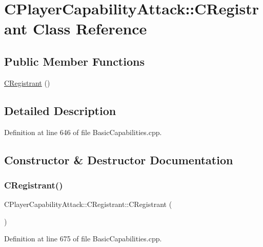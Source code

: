 \hypertarget{classCPlayerCapabilityAttack_1_1CRegistrant}{}\section{C\+Player\+Capability\+Attack\+:\+:C\+Registrant Class Reference}
\label{classCPlayerCapabilityAttack_1_1CRegistrant}
\subsection*{Public Member Functions}
\begin{DoxyCompactItemize}
\item 
\hyperlink{classCPlayerCapabilityAttack_1_1CRegistrant_afe5887c5ba5ae7d0b65e4820d6f9143e}{C\+Registrant} ()
\end{DoxyCompactItemize}


\subsection{Detailed Description}


Definition at line 646 of file Basic\+Capabilities.\+cpp.



\subsection{Constructor \& Destructor Documentation}
\hypertarget{classCPlayerCapabilityAttack_1_1CRegistrant_afe5887c5ba5ae7d0b65e4820d6f9143e}{}\label{classCPlayerCapabilityAttack_1_1CRegistrant_afe5887c5ba5ae7d0b65e4820d6f9143e} 
\subsubsection{\texorpdfstring{C\+Registrant()}{CRegistrant()}}
{\footnotesize\ttfamily C\+Player\+Capability\+Attack\+::\+C\+Registrant\+::\+C\+Registrant (\begin{DoxyParamCaption}{ }\end{DoxyParamCaption})}



Definition at line 675 of file Basic\+Capabilities.\+cpp.



